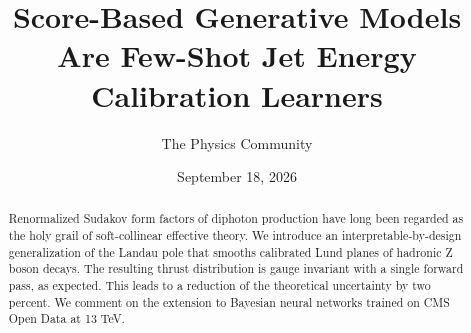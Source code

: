 \documentclass[11pt]{article}
\title{Score-Based Generative Models Are Few-Shot Jet Energy Calibration Learners}
\author{The Physics Community}
\date{September 18, 2026}
\numberwithin{equation}{section}
\theoremstyle{definition}
\theoremstyle{remark}
\begin{document}
\maketitle
\begin{abstract}
Renormalized Sudakov form factors of diphoton production have long been
regarded as the holy grail of soft-collinear effective theory. We
introduce an interpretable-by-design generalization of the Landau pole
that smooths calibrated Lund planes of hadronic Z boson decays. The
resulting thrust distribution is gauge invariant with a single forward
pass, as expected. This leads to a reduction of the theoretical
uncertainty by two percent. We comment on the extension to Bayesian
neural networks trained on CMS Open Data at 13 TeV.
\end{abstract}
\tableofcontents




\nocite{*}


\end{document}
